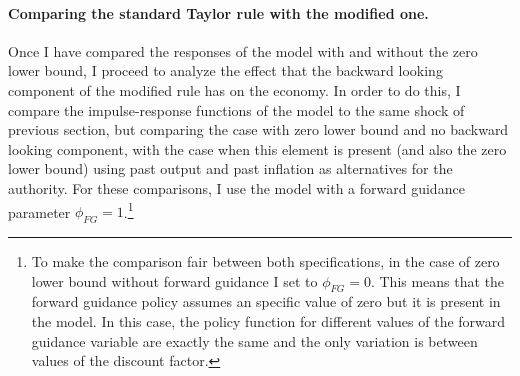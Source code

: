\documentclass[12pt]{article}
\numberwithin{equation}{section}
\begin{document}
\paragraph{Comparing the standard Taylor rule with the modified one.} Once I have compared the responses of the model with and without the zero lower bound, I proceed to analyze the effect that the backward looking component of the modified rule has on the economy. In order to do this, I compare the impulse-response functions of the model to the same shock of previous section, but comparing the case with zero lower bound and no backward looking component, with the case when this element is present (and also the zero lower bound) using past output and past inflation as alternatives for the authority. For these comparisons, I use the model with a forward guidance parameter $\phi_{FG}=1$.\footnote{To make the comparison fair between both specifications, in the case of zero lower bound without forward guidance I set to $\phi_{FG}=0$. This means that the forward guidance policy assumes an specific value of zero but it is present in the model. In this case, the policy function for different values of the forward guidance variable are exactly the same and the only variation is between values of the discount factor.}
\end{document}
